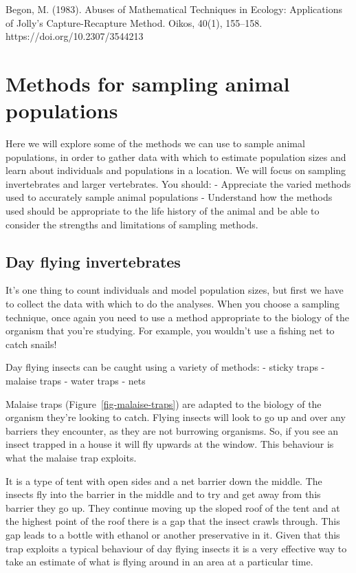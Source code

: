 \documentclass[
  letterpaper,
  DIV=11,
  numbers=noendperiod]{scrreprt}
\begin{document}
Begon, M. (1983). Abuses of Mathematical Techniques in Ecology:
Applications of Jolly's Capture-Recapture Method. Oikos, 40(1),
155--158. https://doi.org/10.2307/3544213

\chapter{Methods for sampling animal
populations}\label{sec-methods-sampling-animal-populations}

Here we will explore some of the methods we can use to sample animal
populations, in order to gather data with which to estimate population
sizes and learn about individuals and populations in a location. We will
focus on sampling invertebrates and larger vertebrates. You should: -
Appreciate the varied methods used to accurately sample animal
populations - Understand how the methods used should be appropriate to
the life history of the animal and be able to consider the strengths and
limitations of sampling methods.

\section{Day flying invertebrates}\label{day-flying-invertebrates}

It's one thing to count individuals and model population sizes, but
first we have to collect the data with which to do the analyses. When
you choose a sampling technique, once again you need to use a method
appropriate to the biology of the organism that you're studying. For
example, you wouldn't use a fishing net to catch snails!

Day flying insects can be caught using a variety of methods: - sticky
traps - malaise traps - water traps - nets

Malaise traps (Figure~\ref{fig-malaise-traps}) are adapted to the
biology of the organism they're looking to catch. Flying insects will
look to go up and over any barriers they encounter, as they are not
burrowing organisms. So, if you see an insect trapped in a house it will
fly upwards at the window. This behaviour is what the malaise trap
exploits.

It is a type of tent with open sides and a net barrier down the middle.
The insects fly into the barrier in the middle and to try and get away
from this barrier they go up. They continue moving up the sloped roof of
the tent and at the highest point of the roof there is a gap that the
insect crawls through. This gap leads to a bottle with ethanol or
another preservative in it. Given that this trap exploits a typical
behaviour of day flying insects it is a very effective way to take an
estimate of what is flying around in an area at a particular time.
\end{document}
